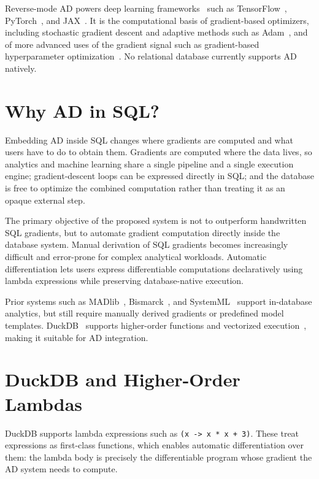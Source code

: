 \documentclass[12pt]{report}
\begin{document}
Reverse-mode AD powers deep learning frameworks~\cite{pearlmutter2008reverse}
such as TensorFlow~\cite{abadi2016tensorflow}, PyTorch~\cite{paszke2019pytorch},
and JAX~\cite{jax2018}. It is the computational basis of gradient-based
optimizers, including stochastic gradient descent and adaptive methods such as
Adam~\cite{kingma2015adam}, and of more advanced uses of the gradient signal
such as gradient-based hyperparameter optimization~\cite{maclaurin2015reversible}.
No relational database currently supports AD natively.

\section{Why AD in SQL?}

Embedding AD inside SQL changes where gradients are computed and what users have
to do to obtain them. Gradients are computed where the data lives, so analytics
and machine learning share a single pipeline and a single execution engine;
gradient-descent loops can be expressed directly in SQL; and the database is
free to optimize the combined computation rather than treating it as an opaque
external step.

The primary objective of the proposed system is not to outperform handwritten
SQL gradients, but to automate gradient computation directly inside the database
system. Manual derivation of SQL gradients becomes increasingly difficult and
error-prone for complex analytical workloads. Automatic differentiation lets
users express differentiable computations declaratively using lambda expressions
while preserving database-native execution.

Prior systems such as MADlib~\cite{madlib}, Bismarck~\cite{feng2012unified},
and SystemML~\cite{boehm2013systemml} support in-database analytics, but still
require manually derived gradients or predefined model templates.
DuckDB~\cite{duckdb2019} supports higher-order functions and vectorized
execution~\cite{raasveldt2022modular}, making it suitable for AD integration.

\section{DuckDB and Higher-Order Lambdas}

DuckDB supports lambda expressions such as \verb|(x -> x * x + 3)|. These treat
expressions as first-class functions, which enables automatic differentiation
over them: the lambda body is precisely the differentiable program whose
gradient the AD system needs to compute.
\end{document}

